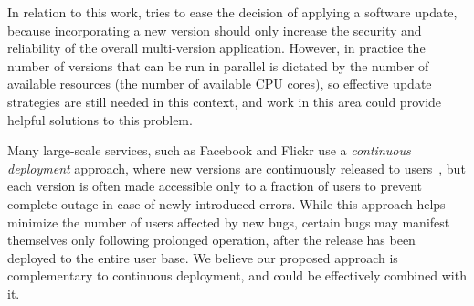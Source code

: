 
In relation to this work, \mx tries to ease the decision of applying a software
update, because incorporating a new version should only increase the security
and reliability of the overall multi-version application.  However, in practice
the number of versions that can be run in parallel is dictated by the number of
available resources (\eg the number of available CPU cores), so effective
update strategies are still needed in this context, and work in this area could
provide helpful solutions to this problem.


Many large-scale services, such as Facebook and Flickr use a {\it continuous
deployment} approach, where new versions are continuously released to
users~\cite{johnson2009,flickr}, but each version is often made accessible only
to a fraction of users to prevent complete outage in case of newly introduced
errors.  While this approach helps minimize the number of users affected by new
bugs, certain bugs may manifest themselves only following prolonged operation,
after the release has been deployed to the entire user base.  We believe our
proposed approach is complementary to continuous deployment, and could be
effectively combined with it.






  
